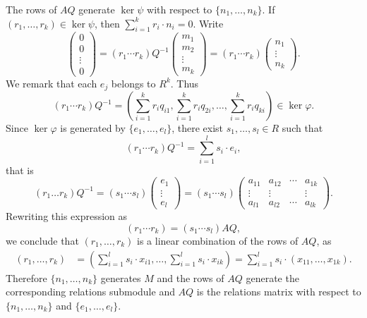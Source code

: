 The rows of $AQ$ generate $\ker\psi$ with respect to $\{n_1,\dots,n_k\}$. 
If $(r_1,\dots,r_k)\in \ker\psi$, then 
$\sum_{i=1}^k r_i\cdot n_i=0$. Write 
\[
\begin{pmatrix}
0\\
0\\
\vdots\\
0	
\end{pmatrix}
=(r_1\cdots r_k)Q^{-1}\begin{pmatrix}
m_1\\
m_2\\
\vdots\\
m_k	
\end{pmatrix}
=(r_1\cdots r_k)\begin{pmatrix}
    n_1\\
    \vdots\\
    n_k
    \end{pmatrix}.
\]
We remark that each $e_j$ belongs to $R^k$. Thus 
\[
(r_1\cdots r_k)Q^{-1} = \left(\sum_{i=1}^k r_i q_{i1},\sum_{i=1}^k r_i q_{2i},\dots,\sum_{i=1}^k r_i q_{ki}\right)\in \ker\varphi.
\]
Since $\ker\varphi$ is generated by $\{e_1,\dots,e_l\}$, there exist 
$s_1,\dots,s_l\in R$ such that 
\[
	(r_1\cdots r_k)Q^{-1}=\sum_{i=1}^l s_i\cdot e_i,
\]
that is 
\[
(r_1\dots r_k)Q^{-1}=(s_1\cdots s_l)\begin{pmatrix}e_1\\\vdots\\ e_l\end{pmatrix}
=(s_1\cdots s_l)\begin{pmatrix}
a_{11} & a_{12} & \cdots & a_{1k}\\
\vdots & \vdots & & \vdots\\
a_{l1} & a_{l2} & \cdots & a_{lk}	
\end{pmatrix}
.
\]
Rewriting this expression as 
\[
(r_1\cdots r_k)=(s_1\cdots s_l)AQ,
\]
we conclude that  $(r_1,\dots,r_k)$ is a linear combination of the rows of $AQ$, as 
\begin{align*}
(r_1,\dots,r_k)&=\left(\sum_{i=1}^l s_i\cdot x_{i1},\dots,\sum_{i=1}^l s_i\cdot x_{ik}\right)
=\sum_{i=1}^l s_i\cdot (x_{11},\dots,x_{1k}).
\end{align*}
Therefore $\{n_1,\dots,n_k\}$ generates $M$ and the rows of $AQ$ generate the
corresponding relations submodule and $AQ$ is the relations matrix with respect
to $\{n_1,\dots,n_k\}$ and $\{e_1,\dots,e_l\}$. 

